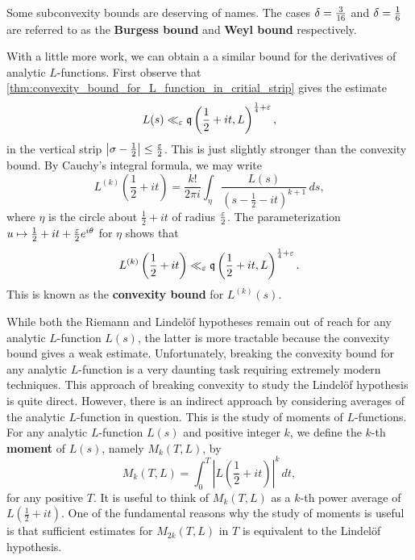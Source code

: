     \begin{remark}
      Some subconvexity bounds are deserving of names. The cases \(\delta = \frac{3}{16}\) and \(\delta = \frac{1}{6}\) are referred to as the \textbf{Burgess bound} and \textbf{Weyl bound} respectively.
    \end{remark}
    
    With a little more work, we can obtain a a similar bound for the derivatives of analytic \(L\)-functions. First observe that \cref{thm:convexity_bound_for_L_function_in_critial_strip} gives the estimate
    \[
      L(s) \ll_{\varepsilon} \mathfrak{q}\left(\frac{1}{2}+it,L\right)^{\frac{1}{4}+\varepsilon},
    \]
    in the vertical strip \(\left|\sigma-\frac{1}{2}\right| \le \frac{\varepsilon}{2}\). This is just slightly stronger than the convexity bound. By Cauchy's integral formula, we may write
    \[
      L^{(k)}\left(\frac{1}{2}+it\right) = \frac{k!}{2\pi i}\int_{\eta}\frac{L(s)}{(s-\frac{1}{2}-it)^{k+1}}\,ds,
    \]
    where \(\eta\) is the circle about \(\frac{1}{2}+it\) of radius \(\frac{\varepsilon}{2}\). The parameterization \(u \mapsto \frac{1}{2}+it+\frac{\varepsilon}{2}e^{i\theta}\) for \(\eta\) shows that
    \[
      L^{(k)}\left(\frac{1}{2}+it\right) \ll_{\varepsilon} \mathfrak{q}\left(\frac{1}{2}+it,L\right)^{\frac{1}{4}+\varepsilon}.
    \]
    This is known as the \textbf{convexity bound} for \(L^{(k)}(s)\).

    While both the Riemann and Lindel\"of hypotheses remain out of reach for any analytic \(L\)-function \(L(s)\), the latter is more tractable because the convexity bound gives a weak estimate. Unfortunately, breaking the convexity bound for any analytic \(L\)-function is a very daunting task requiring extremely modern techniques. This approach of breaking convexity to study the Lindel\"of hypothesis is quite direct. However, there is an indirect approach by considering averages of the analytic \(L\)-function in question. This is the study of moments of \(L\)-functions. For any analytic \(L\)-function \(L(s)\) and positive integer \(k\), we define the \(k\)-th \textbf{moment} of \(L(s)\), namely \(M_{k}(T,L)\), by
    \[
      M_{k}(T,L) = \int_{0}^{T}\left|L\left(\frac{1}{2}+it\right)\right|^{k}\,dt,
    \]
    for any positive \(T\). It is useful to think of \(M_{k}(T,L)\) as a \(k\)-th power average of \(L\left(\frac{1}{2}+it\right)\). One of the fundamental reasons why the study of moments is useful is that sufficient estimates for \(M_{2k}(T,L)\) in \(T\) is equivalent to the Lindel\"of hypothesis.

